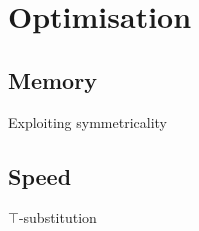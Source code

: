 \section{Optimisation}

    \subsection{Memory}
        Exploiting symmetricality

    \subsection{Speed}
        $\top$-substitution


